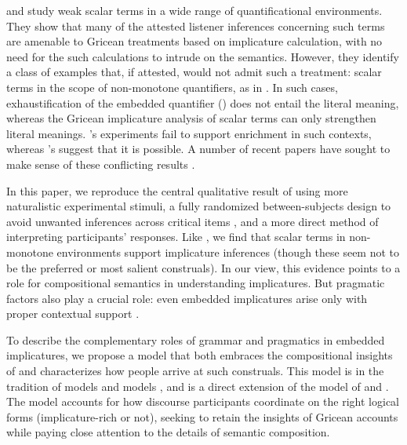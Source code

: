 \documentclass[leqno,12pt]{article}
\begin{document}
\citet{Geurts:Pouscoulous:2009} and \citet{Chemla:Spector:2011} study
weak scalar terms in a wide range of quantificational environments.
They show that many of the attested listener inferences concerning
such terms are amenable to Gricean treatments based on implicature
calculation, with no need for the such calculations to intrude on the
semantics. However, they identify a class of examples that, if
attested, would not admit such a treatment: scalar terms in the scope
of non-monotone quantifiers, as in . In such cases, exhaustification of the embedded
quantifier () does not
entail the literal meaning, whereas the Gricean implicature analysis
of scalar terms can only strengthen literal
meanings. \citeauthor{Geurts:Pouscoulous:2009}'s experiments fail to
support enrichment in such contexts, whereas
\citeauthor{Chemla:Spector:2011}'s suggest that it is possible. A
number of recent papers have sought to make sense of these conflicting
results
\citep{Clifton:Dube:2010,geurts-vantiel:2013:scalar,vanTiel:2014}.


In this paper, we reproduce the central qualitative result of
\citet{Chemla:Spector:2011} using more naturalistic experimental
stimuli, a fully randomized between-subjects design to avoid unwanted
inferences across critical items \citep{geurts-vantiel:2013:scalar},
and a more direct method of interpreting participants' responses. Like
\citeauthor{Chemla:Spector:2011}, we find that scalar terms in
non-monotone environments support implicature inferences (though these
seem not to be the preferred or most salient construals).  In our
view, this evidence points to a role for compositional semantics in
understanding implicatures. But pragmatic factors also play a crucial
role: even embedded implicatures arise only with proper contextual
support
\citep{Russell06,ChierchiaFoxSpector08,Geurts:2011,Chemla:Spector:2011}.

To describe the complementary roles of grammar and pragmatics in
embedded implicatures, we propose a model that both embraces the
compositional insights of \citeauthor{ChierchiaFoxSpector08} and
characterizes how people arrive at such construals. This model is in
the tradition of  models
\citep{Frank:Goodman:2012,Goodman:Stuhlmuller:2013} and  models \citep{Franke09DISS,Jaeger:2011}, and is a
direct extension of the  model
of \citet{Bergen:Goodman:Levy:2012} and
\citet{Bergen:Levy:Goodman:2014}. The model accounts for how discourse
participants coordinate on the right logical forms (implicature-rich
or not), seeking to retain the insights of Gricean accounts while
paying close attention to the details of semantic composition.
\end{document}

